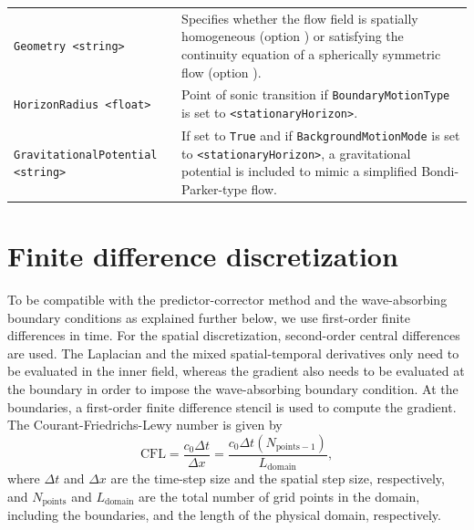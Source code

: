 \begin{longtable}{p{} p{}}
{\tt Geometry <string>} & Specifies whether the flow field is spatially homogeneous (option {\tt <1dCartesian>}) or satisfying the continuity equation of a spherically symmetric flow (option {\tt <3dSphericallySymmetric>}). \\
{\tt HorizonRadius <float>} & Point of sonic transition if {\tt BoundaryMotionType} is set to {\tt <stationaryHorizon>}. \\
{\tt GravitationalPotential <string>} & If set to {\tt True} and if {\tt BackgroundMotionMode} is set to {\tt <stationaryHorizon>}, a gravitational potential is included to mimic a simplified Bondi-Parker-type flow. \\
 \hline
\end{longtable} \vspace{1em}


\section{Finite difference discretization}
\label{sec:Finite difference discretization}

To be compatible with the predictor-corrector method and the wave-absorbing boundary conditions as explained further below, we use first-order finite differences in time. For the spatial discretization, second-order central differences are used. The Laplacian and the mixed spatial-temporal derivatives only need to be evaluated in the inner field, whereas the gradient also needs to be evaluated at the boundary in order to impose the wave-absorbing boundary condition. At the boundaries, a first-order finite difference stencil is used to compute the gradient. The Courant-Friedrichs-Lewy number is given by
\begin{equation}
\mathrm{CFL} = \dfrac{c_0\Delta t}{\Delta x} = \dfrac{c_0\Delta t\left(N_{\mathrm{points}-1}\right)}{L_{\mathrm{domain}}},
\label{eq:CFL}
\end{equation}
where $\Delta t$ and $\Delta x$ are the time-step size and the spatial step size, respectively, and $N_{\mathrm{points}}$ and $L_{\mathrm{domain}}$ are the total number of grid points in the domain, including the boundaries, and the length of the physical domain, respectively.

